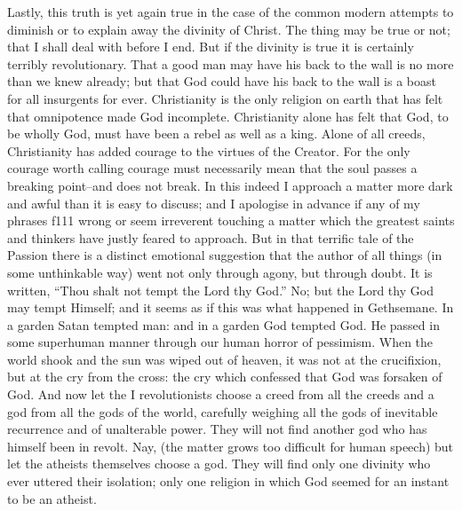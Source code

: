 \documentclass{book}
\begin{document}
Lastly, this truth is yet again true in the case of the common modern attempts to diminish or to explain away the divinity of Christ. The thing may be true or not; that I shall deal with before I end. But if the divinity is true it is certainly terribly revolutionary. That a good man may have his back to the wall is no more than we knew already; but that God could have his back to the wall is a boast for all insurgents for ever. Christianity is the only religion on earth that has felt that omnipotence made God incomplete. Christianity alone has felt that God, to be wholly God, must have been a rebel as well as a king. Alone of all creeds, Christianity has added courage to the virtues of the Creator. For the only courage worth calling courage must necessarily mean that the soul passes a breaking point–and does not break. In this indeed I approach a matter more dark and awful than it is easy to discuss; and I apologise in advance if any of my phrases f111 wrong or seem irreverent touching a matter which the greatest saints and thinkers have justly feared to approach. But in that terrific tale of the Passion there is a distinct emotional suggestion that the author of all things (in some unthinkable way) went not only through agony, but through doubt. It is written, “Thou shalt not tempt the Lord thy God.” No; but the Lord thy God may tempt Himself; and it seems as if this was what happened in Gethsemane. In a garden Satan tempted man: and in a garden God tempted God. He passed in some superhuman manner through our human horror of pessimism. When the world shook and the sun was wiped out of heaven, it was not at the crucifixion, but at the cry from the cross: the cry which confessed that God was forsaken of God. And now let the I revolutionists choose a creed from all the creeds and a god from all the gods of the world, carefully weighing all the gods of inevitable recurrence and of unalterable power. They will not find another god who has himself been in revolt. Nay, (the matter grows too difficult for human speech) but let the atheists themselves choose a god. They will find only one divinity who ever uttered their isolation; only one religion in which God seemed for an instant to be an atheist.
\end{document}
